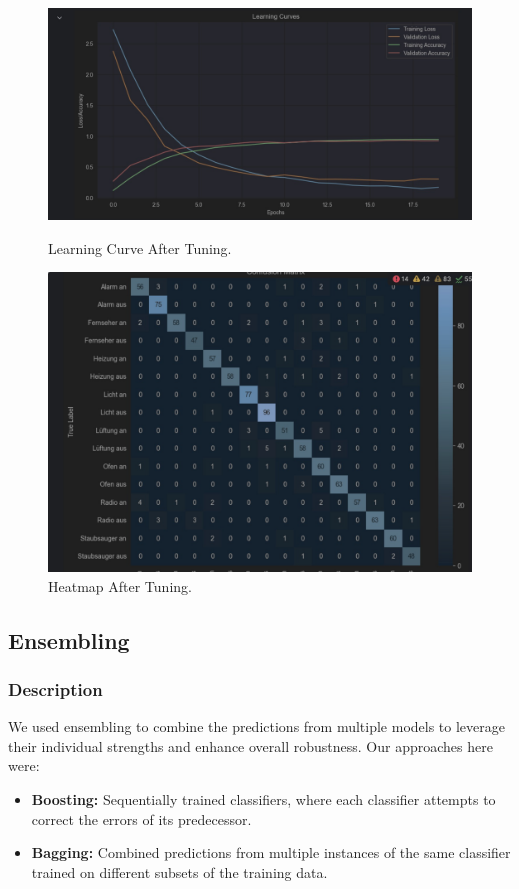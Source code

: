 \begin{figure}[!ht]
	\centering
	\begin{minipage}{0.49\textwidth}
		\centering
		\includegraphics[scale=0.15]{fig/tuned_learning_curves}
		\caption{Learning Curve After Tuning.}
      \label{fig:tuned_learning_curves}
	\end{minipage}\hfill
	\begin{minipage}{0.2\textwidth}
		\centering
		\includegraphics[scale=0.1]{fig/tuned_heatmap}
		\caption{Heatmap After Tuning.}
        \label{fig:tuned_heatmap}
	\end{minipage}

\end{figure}

\subsection{Ensembling}
\subsubsection{Description}
We used ensembling to combine the predictions from multiple models to leverage their individual strengths and enhance overall robustness. Our approaches here were:
\begin{itemize}
  \item \textbf{Boosting:} Sequentially trained classifiers, where each classifier attempts to correct the errors of its predecessor.
  \item \textbf{Bagging:} Combined predictions from multiple instances of the same classifier trained on different subsets of the training data.
\end{itemize}

